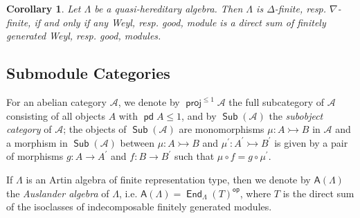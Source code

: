 \documentclass[oneside, a4paper,reqno]{amsart}
\numberwithin{equation}{section}
\newtheorem{cor}[thm]{Corollary}
\theoremstyle{definition}
\begin{document}
\begin{cor} Let $\Lambda$ be a quasi-hereditary algebra. Then
$\Lambda$ is $\Delta$-finite, resp. $\nabla$-finite, if and only if
any Weyl, resp. good, module is a direct sum of finitely generated
Weyl, resp. good, modules.
\end{cor}

\subsection{Submodule Categories} For an abelian category ${\mathscr A}$, we denote by $\operatorname*{\mathsf{proj}}^{\leq 1}{\mathscr A}$ the full subcategory of ${\mathscr A}$ consisting of all objects  $A$ with $\operatorname{\mathsf{pd}} A\leq 1$, and by $\operatorname*{\mathsf{Sub}}({\mathscr A})$ the {\em
subobject category} of ${\mathscr A}$; the objects of $\operatorname*{\mathsf{Sub}}({\mathscr A})$ are
monomorphisms $\mu : A {\rightarrowtail} B$ in ${\mathscr A}$ and a morphism in
$\operatorname*{\mathsf{Sub}}({\mathscr A})$ between $\mu : A {\rightarrowtail} B$ and $\mu^{\prime} : A^{\prime}
{\rightarrowtail} B^{\prime}$ is given by a pair of morphisms $g : A {\longrightarrow}
A^{\prime}$ and $f : B {\longrightarrow} B^{\prime}$ such that $\mu \circ f = g
\circ \mu^{\prime}$.

If  $\Lambda$ is an Artin algebra of finite representation type, then we denote by
$\mathsf{A}(\Lambda)$ the {\em Auslander algebra} of $\Lambda$, i.e.
$\mathsf{A}(\Lambda) = \operatorname*{\mathsf{End}}_{\Lambda}(T)^\operatorname*{\mathsf{op}}$, where $T$ is the
direct sum of the isoclasses of indecomposable finitely generated
modules.
\end{document}
